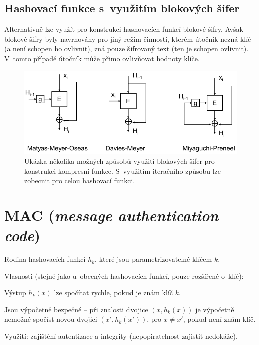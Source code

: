 \subsection*{Hashovací funkce s~využitím blokových šifer}

Alternativně lze využít pro konstrukci hashovacích funkcí blokové šifry. Avšak blokové šifry byly navrhovány pro jiný režim činnosti, kterém útočník nezná klíč (a není schopen ho ovlivnit), zná pouze šifrovaný text (ten je schopen ovlivnit). V~tomto případě útočník může přimo ovlivňovat hodnoty klíče.

\begin{figure}[H]
    \centering
    \includegraphics[width=0.9\linewidth]{hash_function_blocks.pdf}
    \caption{Ukázka několika možných způsobů využití blokových šifer pro konstrukci kompresní funkce. S~využitím iteračního způsobu lze zobecnit pro celou hashovací funkci.}
\end{figure}


\section{MAC (\textit{message authentication code})}

\begin{compactitem}
    \item Rodina hashovacích funkcí $h_k$, které jsou parametrizovatelné klíčem $k$.
    \item Vlasnosti (stejné jako u~obecných hashovacích funkcí, pouze rozšířené o~klíč): \begin{compactitem}
        \item Výstup $h_k(x)$ lze spočítat rychle, pokud je znám klíč $k$.
        \item Jsou výpočetně bezpečné -- při znalosti dvojice $(x, h_k(x))$ je výpočetně nemožné spočíst novou dvojici $(x', h_k(x'))$, pro $x \neq x'$, pokud není znám klíč.
    \end{compactitem}
    \item Využití: zajištění autentizace a integrity (nepopiratelnost zajistit nedokáže).
\end{compactitem}

